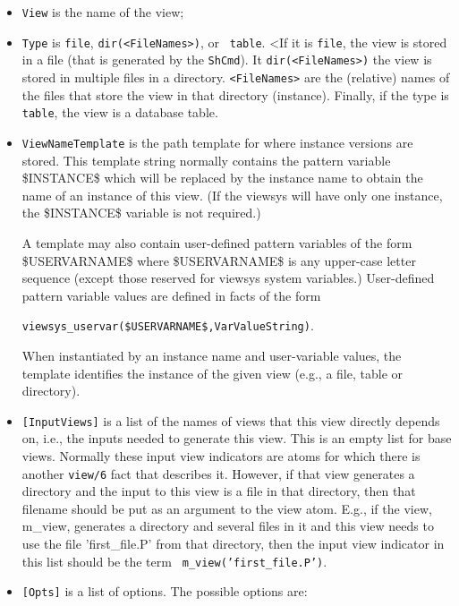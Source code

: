 \begin{itemize}
\item {\tt View} is the name of the view;

\item {\tt Type} is {\tt file}, {\tt dir(<FileNames>)}, or {\tt
  table}.
<If it is {\tt file}, the view is stored in a file (that is generated
by the {\tt ShCmd}).  It {\tt dir(<FileNames>)} the view is stored in
multiple files in a directory.  {\tt <FileNames>} are the (relative)
names of the files that store the view in that directory
(instance). Finally, if the type is {\tt table}, the view is a
database table.

\item {\tt ViewNameTemplate} is the path template for where instance
  versions are stored.  This template string normally contains the
  pattern variable \$INSTANCE\$ which will be replaced by the instance
  name to obtain the name of an instance of this view.  (If the
  viewsys will have only one instance, the \$INSTANCE\$ variable is
  not required.)  
 
  A template may also contain user-defined pattern variables of the
  form \$USERVARNAME\$ where \$USERVARNAME\$ is any upper-case letter
  sequence (except those reserved for viewsys system variables.)
  User-defined pattern variable values are defined in facts of the
  form 

{\tt viewsys\_uservar(\$USERVARNAME\$,VarValueString)}.  

\noindent
When
  instantiated by an instance name and user-variable values, the
  template identifies the instance of the given view (e.g., a file,
  table or directory).

\item {\tt [InputViews]} is a list of the names of views that this
  view directly depends on, i.e., the inputs needed to generate this
  view.  This is an empty list for base views.  Normally these input
  view indicators are atoms for which there is another {\tt view/6}
  fact that describes it.  However, if that view generates a directory
  and the input to this view is a file in that directory, then that
  filename should be put as an argument to the view atom.  E.g., if
  the view, m\_view, generates a directory and several files in it and
  this view needs to use the file 'first\_file.P' from that directory,
  then the input view indicator in this list should be the term {\tt
    m\_view('first\_file.P')}.

\item {\tt [Opts]} is a list of options. The possible options are:


\end{itemize}
